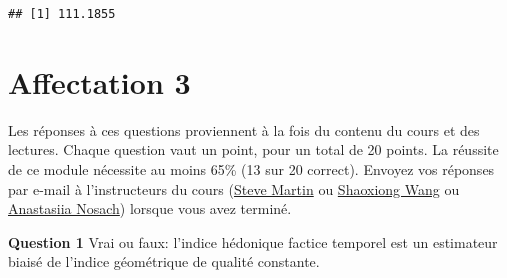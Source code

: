 \documentclass[
]{article}
\newenvironment{Shaded}{\begin{snugshade}}{\end{snugshade}}
\newcommand{\AttributeTok}[1]{\textcolor[rgb]{0.77,0.63,0.00}{#1}}
\newcommand{\CommentTok}[1]{\textcolor[rgb]{0.56,0.35,0.01}{\textit{#1}}}
\newcommand{\DecValTok}[1]{\textcolor[rgb]{0.00,0.00,0.81}{#1}}
\newcommand{\FunctionTok}[1]{\textcolor[rgb]{0.00,0.00,0.00}{#1}}
\newcommand{\NormalTok}[1]{#1}
\newcommand{\OtherTok}[1]{\textcolor[rgb]{0.56,0.35,0.01}{#1}}
\newcommand{\SpecialCharTok}[1]{\textcolor[rgb]{0.00,0.00,0.00}{#1}}
\begin{document}
\begin{Shaded}
\end{Shaded}

\begin{verbatim}
## [1] 111.1855
\end{verbatim}

\hypertarget{affectation-3}{%
\section{Affectation 3}\label{affectation-3}}

Les réponses à ces questions proviennent à la fois du contenu du cours et des lectures. Chaque question vaut un point, pour un total de 20 points. La réussite de ce module nécessite au moins 65\% (13 sur 20 correct). Envoyez vos réponses par e-mail à l'instructeurs du cours (\href{mailto:steve.martin5@canada.ca}{Steve Martin} ou \href{mailto:shaoxiong.wang@canada.ca}{Shaoxiong Wang} ou \href{mailto:anastasiia.nosach@canada.ca}{Anastasiia Nosach}) lorsque vous avez terminé.

\textbf{Question 1} Vrai ou faux: l'indice hédonique factice temporel est un estimateur biaisé de l'indice géométrique de qualité constante.
\end{document}
